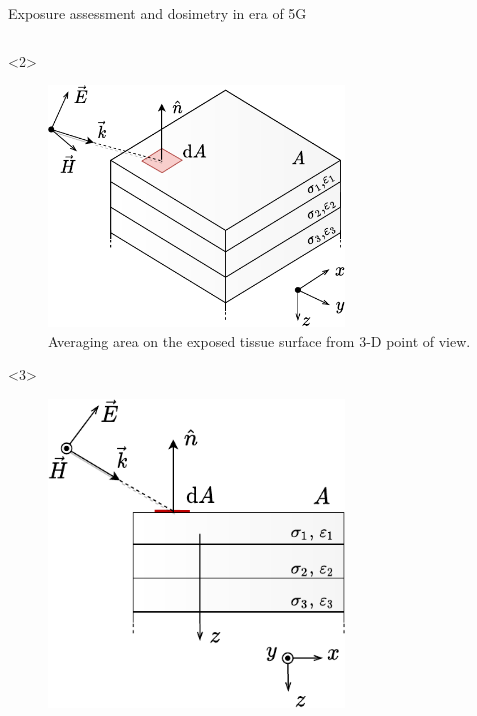 \documentclass[xcolor=dvipsnames,10pt]{beamer}
\begin{document}
\begin{frame}{Exposure assessment and dosimetry in era of 5G}
\begin{columns}[c]
\begin{column}{0.5\textwidth}
\begin{onlyenv}
            \end{onlyenv}
            \begin{onlyenv}<2>
                \begin{center}
                \begin{figure}
                    \includegraphics[width=0.7\textwidth]{figures/averaging_surface.a.pdf}
                    \caption{Averaging area on the exposed tissue surface from 3-D point of view.}
                \end{figure}
                \end{center}
            \end{onlyenv}
            \begin{onlyenv}<3>
                \begin{center}
                \begin{figure}
                    \includegraphics[width=0.7\textwidth]{figures/averaging_surface.b.pdf}

\end{figure}
\end{center}
\end{onlyenv}
\end{column}
\end{columns}
\end{frame}
\end{document}

